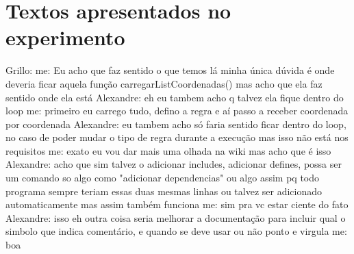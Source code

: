 \newpage

\appendix
\chapter{Textos apresentados no experimento}
\label{apendice_log}
Grillo: me: Eu acho que faz sentido o que temos lá
minha única dúvida é onde deveria ficar aquela função carregarListCoordenadas()
mas acho que ela faz sentido onde ela está
 Alexandre:  eh eu tambem acho q talvez ela fique dentro do loop
 me:  primeiro eu carrego tudo, defino a regra
e aí passo a receber coordenada por coordenada
 Alexandre:  eu tambem acho
só faria sentido ficar dentro do loop, no caso de poder mudar o tipo de regra durante a execução
mas isso não está nos requisitos
 me:  exato
eu vou dar mais uma olhada na wiki
mas acho que é isso
 Alexandre:  acho que sim
talvez o adicionar includes, adicionar defines, possa ser um comando so
algo como "adicionar dependencias"
ou algo assim
pq todo programa sempre teriam essas duas mesmas linhas
ou talvez ser adicionado automaticamente
mas assim também funciona
 me:  sim
pra vc estar ciente do fato
 Alexandre:  isso eh
outra coisa seria melhorar a documentação para incluir qual o simbolo que indica comentário, e quando se deve usar ou não ponto e virgula
 me:  boa
